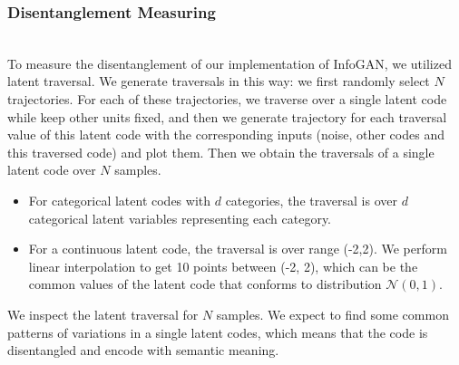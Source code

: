 \subsubsection{Disentanglement Measuring}
\hfill \\
To measure the disentanglement of our implementation of InfoGAN, we utilized latent traversal. We generate traversals in this way: we first randomly select $N$ trajectories. For each of these trajectories, we traverse over a single latent code while keep other units fixed, and then we generate trajectory for each traversal value of this latent code with the corresponding inputs (noise, other codes and this traversed code) and plot them. Then we obtain the traversals of a single latent code over $N$ samples.

\begin{itemize}
  \item For categorical latent codes with $d$ categories, the traversal is over $d$ categorical latent variables representing each category.
  \item For a continuous latent code, the traversal is over range (-2,2). We perform linear interpolation to get 10 points between (-2, 2), which can be the common values of the latent code that conforms to distribution $\mathcal{N}(0, 1)$.
\end{itemize}

We inspect the latent traversal for $N$ samples. We expect to find some common patterns of variations in a single latent codes, which means that the code is disentangled and encode with semantic meaning.
